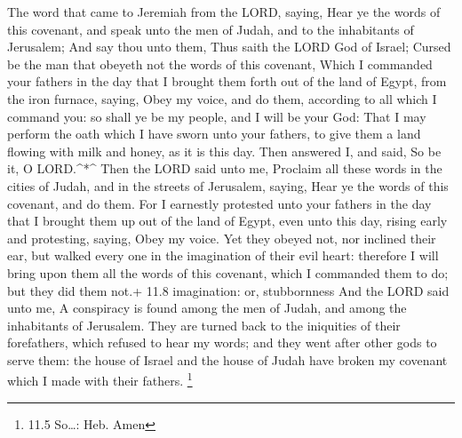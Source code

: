  The word that came to Jeremiah from the LORD, saying,
 Hear ye the words of this covenant, and speak unto the men
of Judah, and to the inhabitants of Jerusalem;  And say thou
unto them, Thus saith the LORD God of Israel; Cursed be the man that
obeyeth not the words of this covenant,  Which I commanded
your fathers in the day that I brought them forth out of the land of
Egypt, from the iron furnace, saying, Obey my voice, and do them,
according to all which I command you: so shall ye be my people, and I
will be your God:  That I may perform the oath which I have
sworn unto your fathers, to give them a land flowing with milk and
honey, as it is this day. Then answered I, and said, So be it, O
LORD.\^{}*\^{}  Then the LORD said unto me, Proclaim all
these words in the cities of Judah, and in the streets of Jerusalem,
saying, Hear ye the words of this covenant, and do them. 
For I earnestly protested unto your fathers in the day that I brought
them up out of the land of Egypt, even unto this day, rising early and
protesting, saying, Obey my voice.  Yet they obeyed not, nor
inclined their ear, but walked every one in the imagination of their
evil heart: therefore I will bring upon them all the words of this
covenant, which I commanded them to do; but they did them not.+ 11.8
imagination: or, stubbornness  And the LORD said unto me, A
conspiracy is found among the men of Judah, and among the inhabitants of
Jerusalem.  They are turned back to the iniquities of their
forefathers, which refused to hear my words; and they went after other
gods to serve them: the house of Israel and the house of Judah have
broken my covenant which I made with their fathers. \footnote{11.5
  So\ldots: Heb. Amen}

